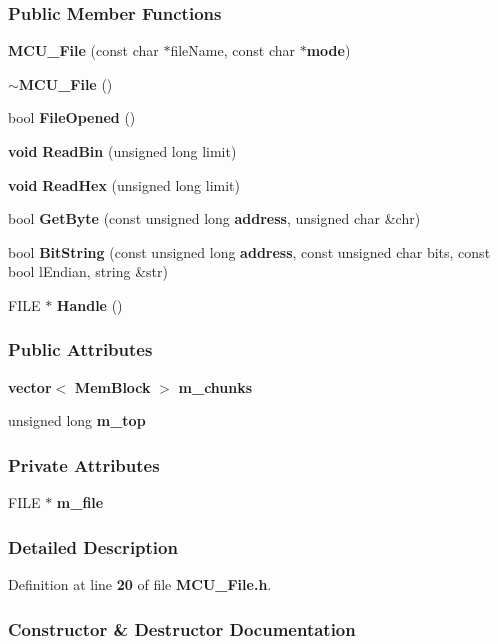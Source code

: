 \subsubsection*{Public Member Functions}
\begin{DoxyCompactItemize}
\item 
{\bf M\+C\+U\+\_\+\+File} (const char $\ast$file\+Name, const char $\ast${\bf mode})
\item 
{\bf $\sim$\+M\+C\+U\+\_\+\+File} ()
\item 
bool {\bf File\+Opened} ()
\item 
{\bf void} {\bf Read\+Bin} (unsigned long limit)
\item 
{\bf void} {\bf Read\+Hex} (unsigned long limit)
\item 
bool {\bf Get\+Byte} (const unsigned long {\bf address}, unsigned char \&chr)
\item 
bool {\bf Bit\+String} (const unsigned long {\bf address}, const unsigned char bits, const bool l\+Endian, string \&str)
\item 
F\+I\+LE $\ast$ {\bf Handle} ()
\end{DoxyCompactItemize}
\subsubsection*{Public Attributes}
\begin{DoxyCompactItemize}
\item 
{\bf vector}$<$ {\bf Mem\+Block} $>$ {\bf m\+\_\+chunks}
\item 
unsigned long {\bf m\+\_\+top}
\end{DoxyCompactItemize}
\subsubsection*{Private Attributes}
\begin{DoxyCompactItemize}
\item 
F\+I\+LE $\ast$ {\bf m\+\_\+file}
\end{DoxyCompactItemize}


\subsubsection{Detailed Description}


Definition at line {\bf 20} of file {\bf M\+C\+U\+\_\+\+File.\+h}.



\subsubsection{Constructor \& Destructor Documentation}
